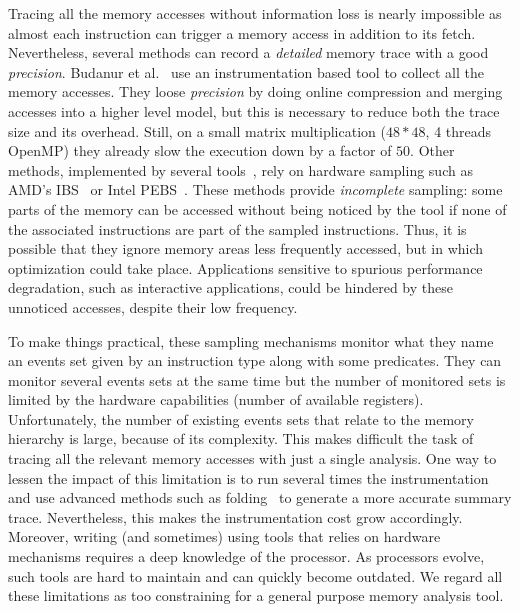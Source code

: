 Tracing all the memory accesses without information loss is nearly impossible as almost each instruction can trigger a memory access in addition to its fetch.
Nevertheless, several methods can record a \emph{detailed} memory trace with a good \emph{precision}.
Budanur et al.~\cite{Budanur11Memory} use an instrumentation based tool to collect all the memory accesses.
They loose \emph{precision} by doing online compression and merging accesses into a higher level model, but this is necessary to reduce both the trace size and its overhead.
Still, on a small matrix multiplication ($48*48$, 4 threads \gls{OpenMP}) they already slow the execution down by a factor of $50$.
Other methods, implemented by several tools~\cite{Lachaize12MemProf,McCurdy10Memphis,Liu14Tool,Gimenez14Dissecting}, rely on hardware sampling such as AMD's \gls{IBS}~\cite{Drongowski07Instructionbased} or Intel \gls{PEBS}~\cite{Levinthal09Performance}.
 These methods provide \emph{incomplete} sampling: some parts of the memory can be accessed without being noticed by the tool if none of the associated instructions are part of the sampled instructions.
 Thus, it is possible that they ignore memory areas less frequently accessed, but in which optimization could take place.
Applications sensitive to spurious performance degradation, such as interactive applications, could be hindered by these unnoticed accesses, despite their low frequency.

To make things practical, these sampling mechanisms monitor what they name an events set given by an instruction type along with some predicates.
They can monitor several events sets at the same time but the number of monitored sets is limited by the hardware capabilities (number of available registers).
Unfortunately, the number of existing events sets that relate to the memory hierarchy is large, because of its complexity.
This makes difficult the task of tracing all the relevant memory accesses with just a single analysis.
One way to lessen the impact of this limitation is to run several times the instrumentation and use advanced methods such as folding~\cite{Servat15Towards} to generate a more accurate summary trace.
Nevertheless, this makes the instrumentation cost grow accordingly.
Moreover, writing (and sometimes) using tools that relies on hardware mechanisms requires a deep knowledge of the processor.
As processors evolve, such tools are hard to maintain and can quickly become outdated.
We regard all these limitations as too constraining for a general purpose memory analysis tool.

